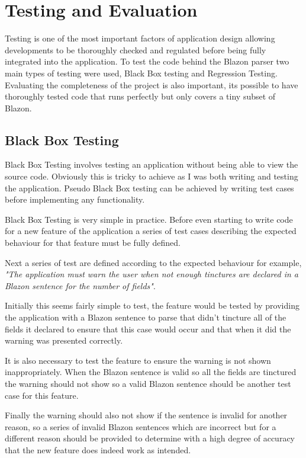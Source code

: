 \chapter{Testing and Evaluation}

Testing is one of the most important factors of application design allowing developments to be thoroughly checked and regulated before being fully integrated into the application.  To test the code behind the Blazon parser two main types of testing were used, Black Box testing and Regression Testing. 
Evaluating the completeness of the project is also important, its possible to have thoroughly tested code that runs perfectly but only covers a tiny subset of Blazon.  
\section{Black Box Testing}

Black Box Testing involves testing an application without being able to view the source code.  Obviously this is tricky to achieve as I was both writing and testing the application.  Pseudo Black Box testing can be achieved by writing test cases before implementing any functionality. 

Black Box Testing is very simple in practice.  Before even starting to write code for a new feature of the application a series of test cases describing the expected behaviour for that feature must be fully defined. 

Next a series of test are defined according to the expected behaviour for example, \emph{"The application must warn the user when not enough tinctures are declared in a Blazon sentence for the number of fields"}.  

Initially this seems fairly simple to test, the feature would be tested by providing the application with a Blazon sentence to parse that didn't tincture all of the fields it declared to ensure that this case would occur and that when it did the warning was presented correctly.

It is also necessary to test the feature to ensure the warning is not shown inappropriately.  When the Blazon sentence is valid so all the fields are tinctured the warning should not show so a valid Blazon sentence should be another test case for this feature.

Finally the warning should also not show if the sentence is invalid for another reason, so a series of invalid Blazon sentences which are incorrect but for a different reason should be provided to determine with a high degree of accuracy that the new feature does indeed work as intended. 

